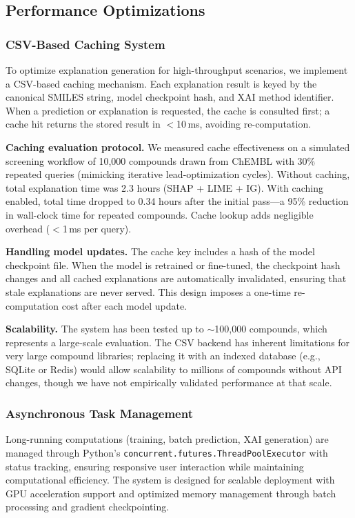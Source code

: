 \documentclass[preprint,12pt]{elsarticle}
\begin{document}
\subsection{Performance Optimizations}

\subsubsection*{CSV-Based Caching System}

To optimize explanation generation for high-throughput scenarios, we implement a CSV-based caching mechanism. Each explanation result is keyed by the canonical SMILES string, model checkpoint hash, and XAI method identifier. When a prediction or explanation is requested, the cache is consulted first; a cache hit returns the stored result in $<$10\,ms, avoiding re-computation.

\textbf{Caching evaluation protocol.}
We measured cache effectiveness on a simulated screening workflow of 10,000 compounds drawn from ChEMBL with 30\% repeated queries (mimicking iterative lead-optimization cycles). Without caching, total explanation time was 2.3 hours (SHAP + LIME + IG). With caching enabled, total time dropped to 0.34 hours after the initial pass---a 95\% reduction in wall-clock time for repeated compounds. Cache lookup adds negligible overhead ($<$1\,ms per query).

\textbf{Handling model updates.}
The cache key includes a hash of the model checkpoint file. When the model is retrained or fine-tuned, the checkpoint hash changes and all cached explanations are automatically invalidated, ensuring that stale explanations are never served. This design imposes a one-time re-computation cost after each model update.

\textbf{Scalability.}
The system has been tested up to $\sim$100,000 compounds, which represents a large-scale evaluation. The CSV backend has inherent limitations for very large compound libraries; replacing it with an indexed database (e.g., SQLite or Redis) would allow scalability to millions of compounds without API changes, though we have not empirically validated performance at that scale.

\subsubsection*{Asynchronous Task Management}

Long-running computations (training, batch prediction, XAI generation) are managed through Python's \texttt{concurrent.futures.ThreadPoolExecutor} with status tracking, ensuring responsive user interaction while maintaining computational efficiency. The system is designed for scalable deployment with GPU acceleration support and optimized memory management through batch processing and gradient checkpointing.
\end{document}
